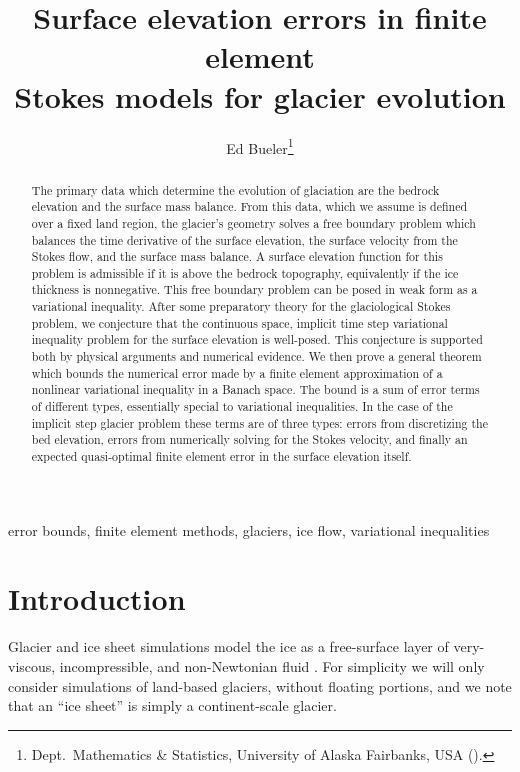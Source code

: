 \documentclass[hidelinks,onefignum,onetabnum,final]{siamart220329}  %
\title{Surface elevation errors in finite element \\ Stokes models for glacier evolution}
\author{Ed Bueler\thanks{Dept.~Mathematics \& Statistics, University of Alaska Fairbanks, USA (\email{elbueler@alaska.edu}).}}
\begin{document}
\maketitle

\begin{abstract}
The primary data which determine the evolution of glaciation are the bedrock elevation and the surface mass balance.  From this data, which we assume is defined over a fixed land region, the glacier's geometry solves a free boundary problem which balances the time derivative of the surface elevation, the surface velocity from the Stokes flow, and the surface mass balance.  A surface elevation function for this problem is admissible if it is above the bedrock topography, equivalently if the ice thickness is nonnegative.  This free boundary problem can be posed in weak form as a variational inequality.  After some preparatory theory for the glaciological Stokes problem, we conjecture that the continuous space, implicit time step variational inequality problem for the surface elevation is well-posed.  This conjecture is supported both by physical arguments and numerical evidence.  We then prove a general theorem which bounds the numerical error made by a finite element approximation of a nonlinear variational inequality in a Banach space.  The bound is a sum of error terms of different types, essentially special to variational inequalities.  In the case of the implicit step glacier problem these terms are of three types: errors from discretizing the bed elevation, errors from numerically solving for the Stokes velocity, and finally an expected quasi-optimal finite element error in the surface elevation itself.
\end{abstract}

\begin{keywords}
error bounds, finite element methods, glaciers, ice flow, variational inequalities
\end{keywords}


\section{Introduction} \label{sec:intro}

Glacier and ice sheet simulations model the ice as a free-surface layer of very-viscous, incompressible, and non-Newtonian fluid \cite{GreveBlatter2009,SchoofHewitt2013}.  For simplicity we will only consider simulations of land-based glaciers, without floating portions, and we note that an ``ice sheet'' is simply a continent-scale glacier.
\end{document}

